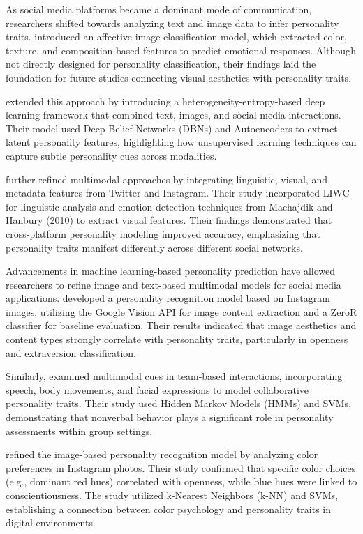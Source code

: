 As social media platforms became a dominant mode of communication, researchers shifted towards analyzing text and image data to infer personality traits. \citet{Machajdik2010} introduced an affective image classification model, which extracted color, texture, and composition-based features to predict emotional responses. Although not directly designed for personality classification, their findings laid the foundation for future studies connecting visual aesthetics with personality traits.

\citet{Xianyu2016} extended this approach by introducing a heterogeneity-entropy-based deep learning framework that combined text, images, and social media interactions. Their model used Deep Belief Networks (DBNs) and Autoencoders to extract latent personality features, highlighting how unsupervised learning techniques can capture subtle personality cues across modalities.

\citet{Skowron2016} further refined multimodal approaches by integrating linguistic, visual, and metadata features from Twitter and Instagram. Their study incorporated LIWC for linguistic analysis and emotion detection techniques from Machajdik and Hanbury (2010) to extract visual features. Their findings demonstrated that cross-platform personality modeling improved accuracy, emphasizing that personality traits manifest differently across different social networks.

Advancements in machine learning-based personality prediction have allowed researchers to refine image and text-based multimodal models for social media applications. \citet{Ferwerda2018} developed a personality recognition model based on Instagram images, utilizing the Google Vision API for image content extraction and a ZeroR classifier for baseline evaluation. Their results indicated that image aesthetics and content types strongly correlate with personality traits, particularly in openness and extraversion classification.

Similarly, \citet{Batrinca2016} examined multimodal cues in team-based interactions, incorporating speech, body movements, and facial expressions to model collaborative personality traits. Their study used Hidden Markov Models (HMMs) and SVMs, demonstrating that nonverbal behavior plays a significant role in personality assessments within group settings.

\citet{Branz2020} refined the image-based personality recognition model by analyzing color preferences in Instagram photos. Their study confirmed that specific color choices (e.g., dominant red hues) correlated with openness, while blue hues were linked to conscientiousness. The study utilized k-Nearest Neighbors (k-NN) and SVMs, establishing a connection between color psychology and personality traits in digital environments.

